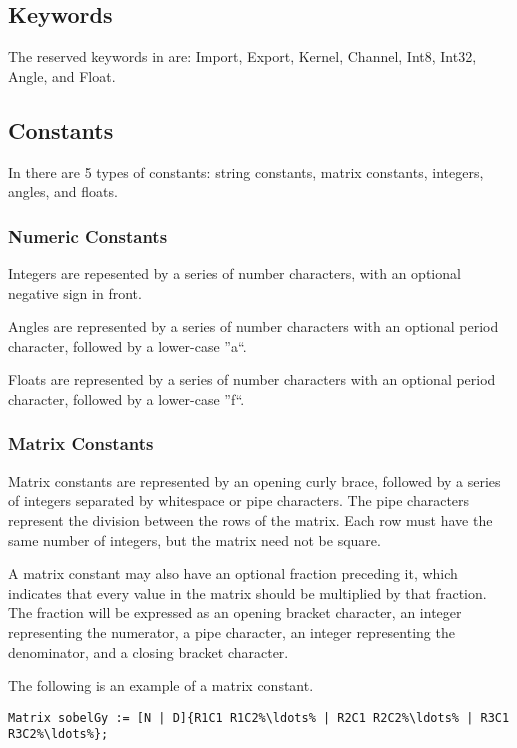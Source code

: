 \subsection{Keywords}
\label{ssec:keywords}
The reserved keywords in \sys{} are:
Import, Export, Kernel, Channel, 
Int8, Int32, Angle, and Float.


\subsection{Constants}
\label{ssec:constants}
In \sys{} there are 5 types of constants: string constants, matrix
constants, integers, angles, and floats.

\subsubsection{Numeric Constants}
\label{sssec:numericconstants}

Integers are repesented by a series of number characters, with an
optional negative sign in front.

Angles are represented by a series of number characters with an
optional period character, followed by a lower-case ''a``.

Floats are represented by a series of number characters with an
optional period character, followed by a lower-case ''f``.

\subsubsection{Matrix Constants}
\label{sssec:matrixconstants}
Matrix constants are represented by an opening curly brace, followed
by a series of integers separated by whitespace or pipe characters.
The pipe characters represent the division between the rows of the
matrix. Each row must have the same number of integers, but the
matrix need not be square.

A matrix constant may also have an optional fraction preceding it,
which indicates that every value in the matrix should be multiplied
by that fraction. The fraction will be expressed as an opening
bracket character, an integer representing the numerator, a pipe
character, an integer representing the denominator, and a closing
bracket character.

The following is an example of a matrix constant.
\begin{lstlisting}[language=CLAM,escapechar=\%]
    Matrix sobelGy := [N | D]{R1C1 R1C2%\ldots% | R2C1 R2C2%\ldots% | R3C1 R3C2%\ldots%};
\end{lstlisting}

